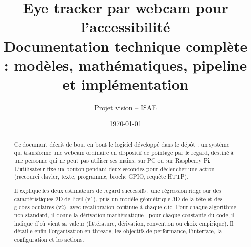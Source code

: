 \documentclass[11pt,a4paper]{report}
\title{\textbf{Eye tracker par webcam pour l'accessibilité}\\[6pt]
  \large Documentation technique complète : modèles, mathématiques, pipeline et implémentation}
\author{Projet vision -- ISAE}
\date{\today}
\begin{document}
\maketitle

\begin{abstract}
Ce document décrit de bout en bout le logiciel développé dans le dépôt : un système qui transforme une webcam ordinaire en dispositif de pointage par le regard, destiné à une personne qui ne peut pas utiliser ses mains, sur PC ou sur Raspberry Pi. L'utilisateur fixe un bouton pendant deux secondes pour déclencher une action (raccourci clavier, texte, programme, broche GPIO, requête HTTP).

Il explique les deux estimateurs de regard successifs : une régression ridge sur des caractéristiques 2D de l'œil (v1), puis un modèle géométrique 3D de la tête et des globes oculaires (v2), avec recalibration continue à chaque clic. Pour chaque algorithme non standard, il donne la dérivation mathématique ; pour chaque constante du code, il indique d'où vient sa valeur (littérature, dérivation, convention ou choix empirique). Il détaille enfin l'organisation en threads, les objectifs de performance, l'interface, la configuration et les actions.
\end{abstract}

\tableofcontents















\appendix



\end{document}
